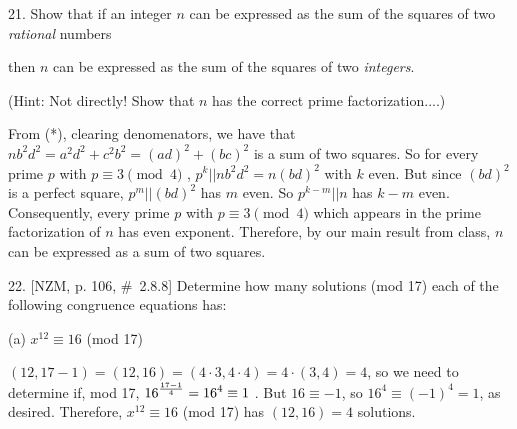 

\ctln{\centerline}
\ssk{\smallskip}
\msk{\medskip}
\bsk{\bigskip}
\dl{\displaystyle}

\overfullrule=0pt
\nopagenumbers




\bsk

\item{21.} Show that if an integer $n$ can be expressed as the sum of the squares of two {\it rational} numbers

\ssk


\ssk

\item{} then $n$ can be expressed as the sum of the squares of two {\it integers}.

\msk

\item{} (Hint: Not directly! Show that $n$ has the correct prime factorization....)

\bsk
\item{} From (*), clearing denomenators, we have that $nb^2d^2=a^2d^2+c^2b^2 = (ad)^2+(bc)^2$ is a sum of two squares. So
for every prime $p$ with $p\equiv 3\pmod{4}$ , $p^k||nb^2d^2=n(bd)^2$ with $k$ even. But since $(bd)^2$ is a perfect square,
$p^m||(bd)^2$ has $m$ even. So $p^{k-m}||n$ has $k-m$ even. Consequently, every prime $p$ with $p\equiv 3\pmod{4}$
which appears in the prime factorization of $n$ has even exponent. Therefore, by our main result from class, $n$ can be
expressed as a sum of two squares.

\bsk

\item{22.} [NZM, p. 106, \#\ 2.8.8] Determine how many solutions (mod 17) each of the following 
congruence equations has:

\msk

\hskip1in (a) $x^{12}\equiv 16$ (mod 17) 

\msk

\item{} $(12,17-1)=(12,16)=(4\cdot 3,4\cdot 4)=4\cdot (3,4) = 4$, so we need to determine if, mod 17, 
$\displaystyle 16^{{17-1}\over{4}} = 16^4\equiv 1$ . But $16\equiv -1$, so $16^4\equiv (-1)^4 = 1$, as desired.
Therefore, $x^{12}\equiv 16$ (mod 17)  has $(12,16)=4$ solutions.

